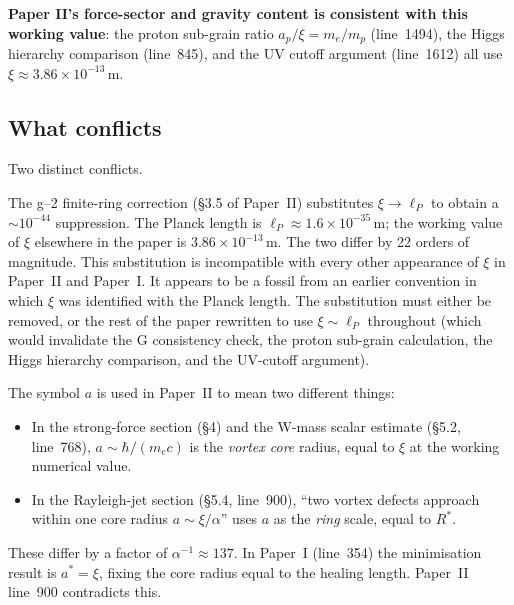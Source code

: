 \documentclass[11pt,a4paper]{article}
\begin{document}
\textbf{Paper II's force-sector and gravity content is consistent with this
working value}: the proton sub-grain ratio $a_p/\xi = m_e/m_p$
(line~1494), the Higgs hierarchy comparison (line~845), and the UV cutoff
argument (line~1612) all use $\xi \approx 3.86\times 10^{-13}\,\mathrm{m}$.

\subsection{What conflicts}

Two distinct conflicts.

\begin{conflictbox}
The g--2 finite-ring correction (\S3.5 of Paper~II) substitutes
$\xi \to \ell_P$ to obtain a $\sim 10^{-44}$ suppression.  The Planck length
is $\ell_P \approx 1.6\times 10^{-35}\,\mathrm{m}$; the working value of $\xi$
elsewhere in the paper is $3.86\times 10^{-13}\,\mathrm{m}$.  The two differ
by 22 orders of magnitude.  This substitution is incompatible with every
other appearance of $\xi$ in Paper~II and Paper~I.  It appears to be a
fossil from an earlier convention in which $\xi$ was identified with the
Planck length.  The substitution must either be removed, or the rest of
the paper rewritten to use $\xi \sim \ell_P$ throughout (which would
invalidate the G consistency check, the proton sub-grain calculation, the
Higgs hierarchy comparison, and the UV-cutoff argument).
\end{conflictbox}

\begin{conflictbox}
The symbol $a$ is used in Paper~II to mean two different things:
\begin{itemize}
    \item In the strong-force section (\S4) and the W-mass scalar estimate
          (\S5.2, line~768), $a \sim \hbar/(m_e c)$ is the \emph{vortex core}
          radius, equal to $\xi$ at the working numerical value.
    \item In the Rayleigh-jet section (\S5.4, line~900), ``two vortex defects
          approach within one core radius $a \sim \xi/\alpha$'' uses $a$ as
          the \emph{ring} scale, equal to $R^*$.
\end{itemize}
These differ by a factor of $\alpha^{-1} \approx 137$.  In Paper~I (line~354)
the minimisation result is $a^* = \xi$, fixing the core radius equal to the
healing length.  Paper~II line~900 contradicts this.
\end{conflictbox}
\end{document}
